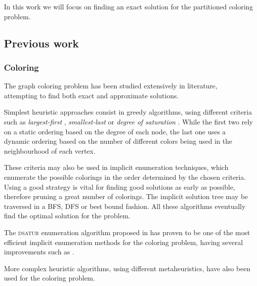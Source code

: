 In this work we will focus on finding an exact solution for the partitioned coloring problem.

\subsection{Previous work}
\label{subsec:previouswork}

\subsubsection*{Coloring}

The graph coloring problem has been studied extensively in literature, attempting to find both exact and approximate solutions.

Simplest heuristic approaches consist in greedy algorithms, using different criteria such as \textit{largest-first} \cite{welsh1967upper}, \textit{smallest-last} \cite{matula1972graph} or \textit{degree of saturation} \cite{brelaz1979new}. While the first two rely on a static ordering based on the degree of each node, the last one uses a dynamic ordering based on the number of different colors being used in the neighbourhood of each vertex.

These criteria may also be used in implicit enumeration techniques, which enumerate the possible colorings in the order determined by the chosen criteria. Using a good strategy is vital for finding good solutions as early as possible, therefore pruning a great number of colorings. The implicit solution tree may be traversed in a BFS, DFS or best bound fashion. All these algorithms eventually find the optimal solution for the problem.

The \textsc{dsatur} enumeration algorithm proposed in \cite{brelaz1979new} has proven to be one of the most efficient implicit enumeration methods for the coloring problem, having several improvements such as \cite{sewell1996improved}.

More complex heuristic algorithms, using different metaheuristics, have also been used for the coloring problem.

